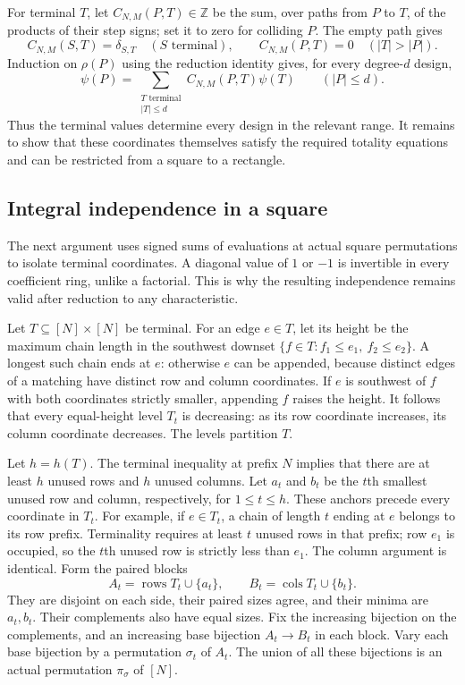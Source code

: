 For terminal $T$, let $C_{N,M}(P,T)\in\mathbb Z$ be the sum, over paths
from $P$ to $T$, of the products of their step signs; set it to zero for
colliding $P$.  The empty path gives
\[
 C_{N,M}(S,T)=\delta_{S,T}\quad(S\text{ terminal}),\qquad
 C_{N,M}(P,T)=0\quad(|T|>|P|).
\]
Induction on $\rho(P)$ using the reduction identity gives, for every
degree-$d$ design,
\begin{equation}\label{eq:terminal-expansion}
 \psi(P)=\sum_{\substack{T\text{ terminal}\\|T|\leq d}}
              C_{N,M}(P,T)\psi(T)\qquad(|P|\leq d).
\end{equation}
Thus the terminal values determine every design in the relevant range.
It remains to show that these coordinates themselves satisfy the required
totality equations and can be restricted from a square to a rectangle.

\subsection{Integral independence in a square}
The next argument uses signed sums of evaluations at actual square
permutations to isolate terminal coordinates. A diagonal value of
$1$ or $-1$ is invertible in every coefficient ring, unlike a factorial.
This is why the resulting independence remains valid after reduction
to any characteristic.

Let $T\subseteq[N]\times[N]$ be terminal.  For an edge $e\in T$, let
its height be the maximum chain length in the southwest downset
$\{f\in T:f_1\leq e_1,\ f_2\leq e_2\}$.  A longest such chain ends
at $e$: otherwise $e$ can be appended, because distinct edges of a
matching have distinct row and column coordinates.  If $e$ is southwest
of $f$ with both coordinates strictly smaller, appending $f$ raises the
height.  It follows that every equal-height level $T_t$ is decreasing:
as its row coordinate increases, its column coordinate decreases.
The levels partition $T$.

Let $h=h(T)$.  The terminal inequality at prefix $N$ implies that there
are at least $h$ unused rows and $h$ unused columns.  Let $a_t$ and $b_t$
be the $t$th smallest unused row and column, respectively, for
$1\leq t\leq h$.  These anchors precede every coordinate in $T_t$.
For example, if $e\in T_t$, a chain of length $t$ ending at $e$ belongs
to its row prefix.  Terminality requires at least $t$ unused rows in
that prefix; row $e_1$ is occupied, so the $t$th unused row is strictly
less than $e_1$.  The column argument is identical.  Form the paired blocks
\[
 A_t=\operatorname{rows}T_t\cup\{a_t\},\qquad
 B_t=\operatorname{cols}T_t\cup\{b_t\}.
\]
They are disjoint on each side, their paired sizes agree, and their
minima are $a_t,b_t$.  Their complements also have equal sizes.  Fix the
increasing bijection on the complements, and an increasing base bijection
$A_t\to B_t$ in each block.  Vary each base bijection by a permutation
$\sigma_t$ of $A_t$.  The union of all these bijections is an actual
permutation $\pi_\sigma$ of $[N]$.

